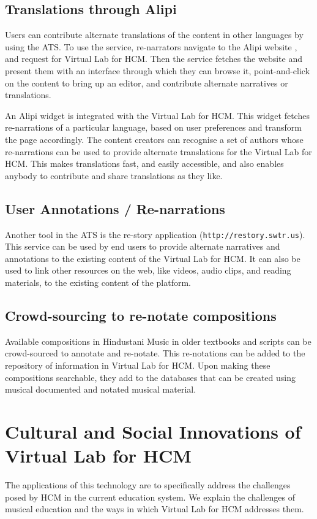 \documentclass{tufte-handout}
\begin{document}
\subsection{Translations through Alipi} Users can contribute alternate translations of the content in other languages by using the ATS.  To use the service, re-narrators navigate to the Alipi website \cite{alipi}, and request for Virtual Lab for HCM. Then the service fetches the website and present them with an interface through which they can browse it, point-and-click on the content
to bring up an editor, and contribute alternate narratives
or translations.

An Alipi widget is integrated with the Virtual Lab for HCM. This widget fetches 
re-narrations of a particular language, based on user preferences and transform
the page accordingly. The content creators can recognise a set of authors whose
re-narrations can be used to provide alternate translations for the Virtual Lab for HCM. This makes translations fast, and easily accessible, and also enables anybody to contribute and share translations as they like.

\subsection{User Annotations / Re-narrations} Another tool in the ATS is the 
re-story application (\texttt{http://restory.swtr.us}). This service can be used by
end users to provide alternate narratives and annotations to
the existing content of the Virtual Lab for HCM. It can also be used to
link other resources on the web, like videos, audio clips, and
reading materials, to the existing content of the platform.


\subsection{Crowd-sourcing to re-notate compositions} Available compositions in
Hindustani Music in older textbooks and scripts can be crowd-sourced to
annotate and re-notate. This re-notations can be added to the repository of
information in Virtual Lab for HCM. Upon making these compositions searchable, they add to the databases that can be created using musical documented and notated musical material. 

\section{Cultural and Social Innovations of Virtual Lab for HCM}
The applications of this technology are to specifically address the challenges posed by HCM in the current education system. We explain the challenges of musical education and the ways in which Virtual Lab for HCM addresses them.
\end{document}
